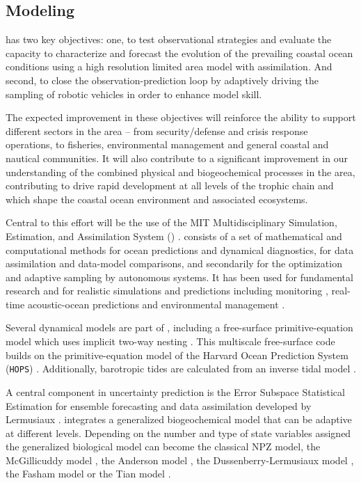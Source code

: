 \vspace{+0.25cm}
\subsection{Modeling}

\proj has two key objectives: one, to test observational strategies
and evaluate the capacity to characterize and forecast the evolution
of the prevailing coastal ocean conditions using a high resolution
limited area model with assimilation. And second, to close the
observation-prediction loop by adaptively driving the sampling of
robotic vehicles in order to enhance model skill.

The expected improvement in these objectives will reinforce the
ability to support different sectors in the area -- from
security/defense and crisis response operations, to fisheries,
environmental management and general coastal and nautical
communities. It will also contribute to a significant improvement in
our understanding of the combined physical and biogeochemical
processes in the \naz area, contributing to drive rapid development at
all levels of the trophic chain and which shape the coastal ocean
environment and associated ecosystems.

Central to this effort will be the use of the MIT Multidisciplinary
Simulation, Estimation, and Assimilation System (\msee)
\cite{haley10,mseas10}. \mse consists of a set of mathematical and
computational methods for ocean predictions and dynamical diagnostics,
for data assimilation and data-model comparisons, and secondarily for
the optimization and adaptive sampling by autonomous systems. It has
been used for fundamental research and for realistic simulations and
predictions including monitoring \cite{lermusiaux07}, real-time
acoustic-ocean predictions \cite{xu08,lermusiaux10} and environmental
management \cite{cossarini09}.

Several dynamical models are part of \msee, including a free-surface
primitive-equation model which uses implicit two-way nesting
\cite{haley10}. This multiscale free-surface code builds on the
primitive-equation model of the Harvard Ocean Prediction System
(\texttt{HOPS}) \cite{robinson96,haley99}.  Additionally, barotropic
tides are calculated from an inverse tidal model
\cite{logutov08a,logutov08b}.

A central component in \mse uncertainty prediction is the Error
Subspace Statistical Estimation for ensemble forecasting and data
assimilation developed by Lermusiaux
\cite{lermusiaux06,lermusiaux07}. \mse integrates a generalized
biogeochemical model that can be adaptive at different
levels. Depending on the number and type of state variables assigned
the generalized biological model can become the classical NPZ model,
the McGillicuddy model \cite{mcgillicuddy95}, the Anderson model
\cite{anderson00}, the Dussenberry-Lermusiaux model
\cite{becsiktepe03}, the Fasham model \cite{fasham90} or the Tian
model \cite{tian00,tian01}.

